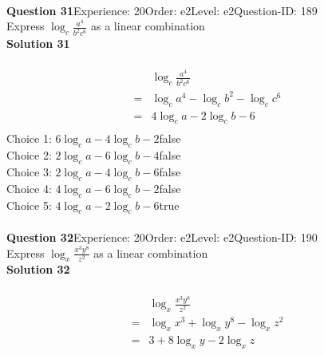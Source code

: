 \documentclass{article}
\begin{document}
\\[4pt]
\noindent\textbf{Question 31}\hspace{20pt}Experience: 20\hspace{20pt}Order: e2\hspace{20pt}Level: e2\hspace{20pt}Question-ID: 189\\[2pt]
Express $\log_{c}\displaystyle\frac{a^4}{b^2c^6}$ as a linear combination\\[4pt]
\noindent\textbf{Solution 31}\\[2pt]
\\[-35pt]\begin{align*}
&\log_{c}\displaystyle\frac{a^4}{b^2c^6}\\[2pt]
=&\log_{c}a^4-\log_{c}b^2-\log_{c}c^6\\[2pt]
=&4\log_{c}a-2\log_{c}b-6\\[-30pt]
\end{align*}
Choice 1: \hspace{20pt}$6\log_{c}a-4\log_{c}b-2$\hspace{20pt}false\\
Choice 2: \hspace{20pt}$2\log_{c}a-6\log_{c}b-4$\hspace{20pt}false\\
Choice 3: \hspace{20pt}$2\log_{c}a-4\log_{c}b-6$\hspace{20pt}false\\
Choice 4: \hspace{20pt}$4\log_{c}a-6\log_{c}b-2$\hspace{20pt}false\\
Choice 5: \hspace{20pt}$4\log_{c}a-2\log_{c}b-6$\hspace{20pt}true\\
\\[4pt]
\noindent\textbf{Question 32}\hspace{20pt}Experience: 20\hspace{20pt}Order: e2\hspace{20pt}Level: e2\hspace{20pt}Question-ID: 190\\[2pt]
Express $\log_{x}\displaystyle\frac{x^3y^8}{z^2}$ as a linear combination\\[4pt]
\noindent\textbf{Solution 32}\\[2pt]
\\[-35pt]\begin{align*}
&\log_{x}\displaystyle\frac{x^3y^8}{z^2}\\[2pt]
=&\log_{x}x^3+\log_{x}y^8-\log_{x}z^2\\[2pt]
=&3+8\log_{x}y-2\log_{x}z\\[-30pt]
\end{align*}
\end{document}
